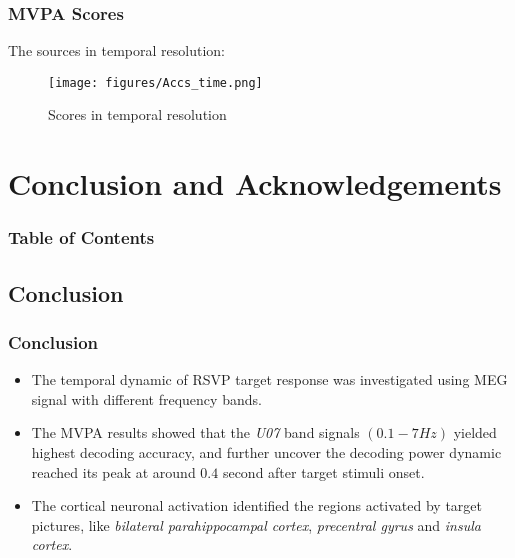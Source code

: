\documentclass[aspectratio=169]{beamer}
\begin{document}
\begin{frame}
    \frametitle{MVPA Scores}
    The sources in temporal resolution:

    \begin{figure}[h]
        \centering
        \texttt{[image: figures/Accs\_time.png]}
        \caption{Scores in temporal resolution}
    \end{figure}

\end{frame}

\section{Conclusion and Acknowledgements}

\begin{frame}[plain]
    \frametitle{Table of Contents}
\end{frame}

\subsection{Conclusion}

\begin{frame}
    \frametitle{Conclusion}
    \begin{itemize}
        \item The temporal dynamic of RSVP target response was investigated using MEG signal with different frequency bands.
        \item The MVPA results showed that the \emph{U07} band signals $(0.1-7 Hz)$ yielded highest decoding accuracy, and further uncover the decoding power dynamic reached its peak at around $0.4$ second after target stimuli onset.
        \item The cortical neuronal activation identified the regions activated by target pictures, like \emph{bilateral parahippocampal cortex}, \emph{precentral gyrus} and \emph{insula cortex}.
    \end{itemize}
\end{frame}
\end{document}
